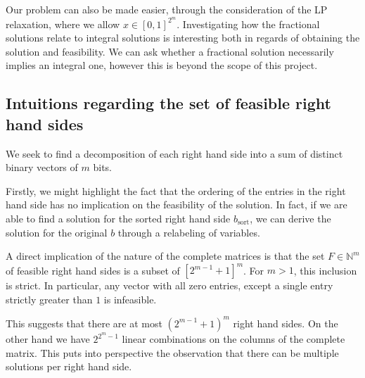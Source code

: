 \documentclass{article}
\begin{document}
Our problem can also be made easier, through the consideration of the LP relaxation, where we allow $x \in \left[0, 1\right]^{2^m}$. Investigating how the fractional solutions relate to integral solutions is interesting both in regards of obtaining the solution and feasibility. We can ask whether a fractional solution necessarily implies an integral one, however this is beyond the scope of this project.
\subsection{Intuitions regarding the set of feasible right hand sides}
We seek to find a decomposition of each right hand side into a sum of distinct binary vectors of $m$ bits.

Firstly, we might highlight the fact that the ordering of the entries in the right hand side has no implication on the feasibility of the solution. In fact, if we are able to find a solution for the sorted right hand side $b_\text{sort}$, we can derive the solution for the original $b$ through a relabeling of variables.

A direct implication of the nature of the complete matrices is that the set $F \in \mathbb{N}^m$ of feasible right hand sides is a subset of $\left[2^{m-1}+1\right]^m$.\footnotemark{}  For $m>1$, this inclusion is strict. In particular, any vector with all zero entries, except a single entry strictly greater than $1$ is infeasible. 

This suggests that there are at most $(2^{m-1}+1)^m$ right hand sides. On the other hand we have $2^{2^{m}-1}$ linear combinations on the columns of the complete matrix. This puts into perspective the observation that there can be multiple solutions per right hand side.
\end{document}
